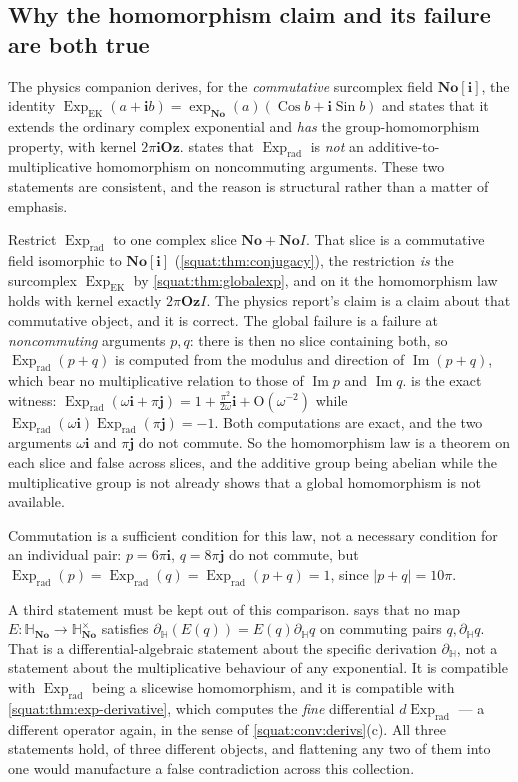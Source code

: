 \documentclass[11pt,letterpaper]{article}
\numberwithin{equation}{section}
\theoremstyle{definition}
\theoremstyle{remark}
\newcommand{\No}{\mathbf{No}}
\newcommand{\SQ}{\mathbb H_{\No}}
\newcommand{\Oz}{\mathbf{Oz}}
\newcommand{\ii}{\mathbf i}
\newcommand{\jj}{\mathbf j}
\newcommand{\Ima}{\operatorname{Im}}
\newcommand{\Exp}{\operatorname{Exp}}
\newcommand{\Expr}{\Exp_{\mathrm{rad}}}
\newcommand{\Sin}{\operatorname{Sin}}
\newcommand{\Cos}{\operatorname{Cos}}
\newcommand{\abs}[1]{\left|#1\right|}
\newcommand{\dH}{\partial_{\mathbb H}}
\begin{document}
\subsection{Why the homomorphism claim and its failure are both true}\label{squat:sub:consistency}
The physics companion \cite{RepoPhys} derives, for the \emph{commutative} surcomplex
field $\No[\ii]$, the identity
$\Exp_{\mathrm{EK}}(a+\ii b)=\exp_{\No}(a)(\Cos b+\ii\Sin b)$ and states that it extends
the ordinary complex exponential and \emph{has} the group-homomorphism property, with
kernel $2\pi\ii\Oz$.  states that $\Expr$ is \emph{not} an
additive-to-multiplicative homomorphism on noncommuting arguments. These two statements
are consistent, and the reason is structural rather than a matter of emphasis.

Restrict $\Expr$ to one complex slice $\No+\No I$. That slice is a commutative field
isomorphic to $\No[\ii]$ (\cref{squat:thm:conjugacy}), the restriction \emph{is} the
surcomplex $\Exp_{\mathrm{EK}}$ by \cref{squat:thm:globalexp}, and on it the homomorphism
law holds with kernel exactly $2\pi\Oz I$. The physics report's claim is a claim about
that commutative object, and it is correct. The global failure is a failure at
\emph{noncommuting} arguments $p,q$: there is then no slice containing both, so
$\Expr(p+q)$ is computed from the modulus and direction of $\Ima(p+q)$, which bear no
multiplicative relation to those of $\Ima p$ and $\Ima q$.
 is the exact witness:
$\Expr(\omega\ii+\pi\jj)=1+\tfrac{\pi^2}{2\omega}\ii+\mathrm O(\omega^{-2})$ while
$\Expr(\omega\ii)\Expr(\pi\jj)=-1$. Both computations are exact, and the two arguments
$\omega\ii$ and $\pi\jj$ do not commute. So the homomorphism law is a theorem on each
slice and false across slices, and the additive group being abelian while the
multiplicative group is not already shows that a global homomorphism is not available.

Commutation is a sufficient condition for this law, not a necessary condition for an
individual pair: $p=6\pi\ii$, $q=8\pi\jj$ do not commute, but
$\Expr(p)=\Expr(q)=\Expr(p+q)=1$, since $\abs{p+q}=10\pi$.

A third statement must be kept out of this comparison.  says
that no map $E:\SQ\to\SQ^\times$ satisfies $\dH(E(q))=E(q)\dH q$ on commuting pairs
$q,\dH q$. That is a differential-algebraic statement about the specific derivation
$\dH$, not a statement about the multiplicative behaviour of any exponential. It is
compatible with $\Expr$ being a slicewise homomorphism, and it is compatible with
\cref{squat:thm:exp-derivative}, which computes the \emph{fine} differential $d\Expr$
--- a different operator again, in the sense of \cref{squat:conv:derivs}(c). All three
statements hold, of three different objects, and flattening any two of them into one
would manufacture a false contradiction across this collection.
\end{document}
